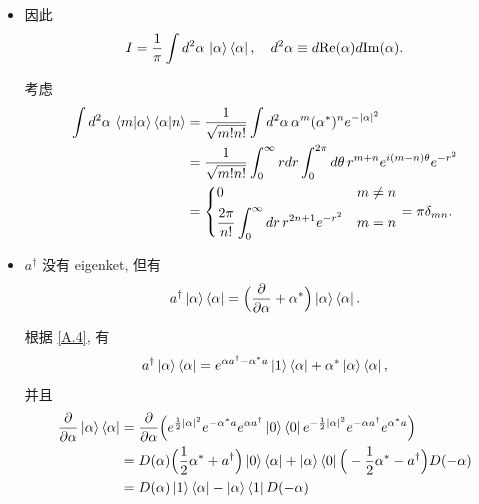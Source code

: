 \documentclass[10pt, a4paper]{article}
\numberwithin{equation}{section}
\begin{document}
\begin{itemize}
		\item 因此
		\begin{equation}
			I = \frac{1}{\pi} \int d^2 \alpha \, \ket{\alpha} \bra{\alpha}, \quad d^2 \alpha \equiv d\mathrm{Re}(\alpha) d\mathrm{Im}(\alpha).
		\end{equation}
		
		\begin{tcolorbox}[title=proof:]
			考虑
			\begin{align}
				\int d^2 \alpha \, \braket{m | \alpha} \braket{\alpha | n} &= \frac{1}{\sqrt{m! n!}} \int d^2 \alpha \, \alpha^m (\alpha^*)^n e^{- |\alpha|^2} \notag \\
				&= \frac{1}{\sqrt{m! n!}} \int_0^\infty r dr \int_0^{2 \pi} d\theta \, r^{m + n} e^{i (m - n) \theta} e^{- r^2} \notag \\
				&= \begin{dcases}
					0 & m \neq n \\
					\frac{2 \pi}{n!} \int_0^\infty dr \, r^{2 n + 1} e^{- r^2} & m = n
				\end{dcases} = \pi \delta_{m n}.
			\end{align}
		\end{tcolorbox}
		
		\item $a^\dag$ 没有 eigenket, 但有
		\begin{equation}
			a^\dag \ket{\alpha} \bra{\alpha} = \Big( \frac{\partial}{\partial \alpha} + \alpha^* \Big) \ket{\alpha} \bra{\alpha}.
		\end{equation}
		
		\begin{tcolorbox}[title=proof:]
			根据 \eqref{A.4}, 有
			\begin{equation}
				a^\dag \ket{\alpha} \bra{\alpha} = e^{\alpha a^\dag - \alpha^* a} \ket{1} \bra{\alpha} + \alpha^* \ket{\alpha} \bra{\alpha},
			\end{equation}
			并且
			\begin{align}
				\frac{\partial}{\partial \alpha} \ket{\alpha} \bra{\alpha} &= \frac{\partial}{\partial \alpha} \Big( e^{\frac{1}{2} |\alpha|^2} e^{- \alpha^* a} e^{\alpha a^\dag} \ket{0} \bra{0} e^{- \frac{1}{2} |\alpha|^2} e^{- \alpha a^\dag} e^{\alpha^* a} \Big) \notag \\
				&= D(\alpha) \Big( \frac{1}{2} \alpha^* + a^\dag \Big) \ket{0} \bra{\alpha} + \ket{\alpha} \bra{0} \Big( - \frac{1}{2} \alpha^* - a^\dag \Big) D(- \alpha) \notag \\
				&= D(\alpha) \ket{1} \bra{\alpha} - \ket{\alpha} \bra{1} D(- \alpha)
			\end{align}
		\end{tcolorbox}
	\end{itemize}
\end{document}
